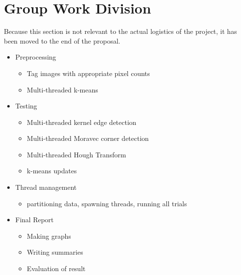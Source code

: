 \documentclass{article}
\begin{document}
\section{Group Work Division}
    Because this section is not relevant to the actual logistics of the project, it has been moved to the end of the proposal.
    \begin{itemize}
    \item Preprocessing
        \begin{itemize}
        \item Tag images with appropriate pixel counts
        \item Multi-threaded k-means
        \end{itemize}
        
    \item Testing
        \begin{itemize}
        \item Multi-threaded kernel edge detection
        \item Multi-threaded Moravec corner detection
        \item Multi-threaded Hough Transform
        \item k-means updates
        \end{itemize}
        
    \item Thread management
        \begin{itemize}
        \item partitioning data, spawning threads, running all trials
        \end{itemize}
        
    \item Final Report
        \begin{itemize}
        \item Making graphs
        \item Writing summaries
        \item Evaluation of result
        \end{itemize}
        
    \end{itemize}
\end{document}
